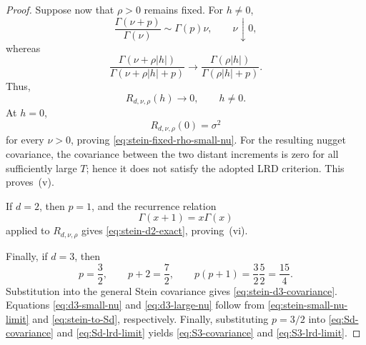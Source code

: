 \documentclass[10pt,a4paper]{amsart}
\begin{document}
\begin{proof}
Suppose now that \(\rho>0\) remains fixed. For \(h\neq0\),
\[
\frac{\Gamma(\nu+p)}{\Gamma(\nu)}
\sim
\Gamma(p)\nu,
\qquad \nu\downarrow0,
\]
whereas
\[
\frac{\Gamma(\nu+\rho|h|)}
{\Gamma(\nu+\rho|h|+p)}
\longrightarrow
\frac{\Gamma(\rho|h|)}
{\Gamma(\rho|h|+p)}.
\]
Thus,
\[
R_{d,\nu,\rho}(h)\longrightarrow0,
\qquad h\neq0.
\]
At \(h=0\),
\[
R_{d,\nu,\rho}(0)=\sigma^2
\]
for every \(\nu>0\), proving
\eqref{eq:stein-fixed-rho-small-nu}. For the resulting nugget
covariance, the covariance between the two distant increments is zero
for all sufficiently large \(T\); hence it does not satisfy the adopted
LRD criterion. This proves~(v).

If \(d=2\), then \(p=1\), and the recurrence relation
\[
\Gamma(x+1)=x\Gamma(x)
\]
applied to \(R_{d,\nu,\rho}\) gives
\eqref{eq:stein-d2-exact}, proving~(vi).

Finally, if \(d=3\), then
\[
p=\frac32,
\qquad
p+2=\frac72,
\qquad
p(p+1)
=
\frac32\frac52
=
\frac{15}{4}.
\]
Substitution into the general Stein covariance gives
\eqref{eq:stein-d3-covariance}. Equations
\eqref{eq:d3-small-nu} and \eqref{eq:d3-large-nu} follow from
\eqref{eq:stein-small-nu-limit} and \eqref{eq:stein-to-Sd},
respectively. Finally, substituting \(p=3/2\) into
\eqref{eq:Sd-covariance} and \eqref{eq:Sd-lrd-limit} yields
\eqref{eq:S3-covariance} and \eqref{eq:S3-lrd-limit}.
\end{proof}
\end{document}
